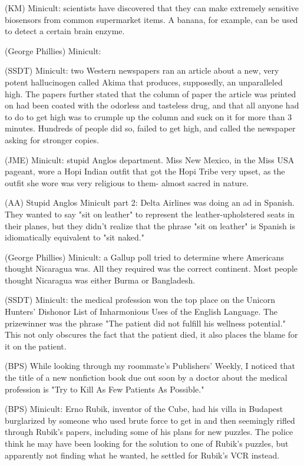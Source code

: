 \documentclass[12pt]{article}
\begin{document}
(KM) Minicult: scientists have discovered that they can make extremely sensitive biosensors from common supermarket items. A banana, for example, can be used to detect a certain brain enzyme.

(George Phillies) Minicult:

(SSDT) Minicult: two Western newspapers ran an article about a new, very potent hallucinogen called Akima that produces, supposedly, an unparalleled high. The papers further stated that the column of paper the article was printed on had been coated with the odorless and tasteless drug, and that all anyone had to do to get high was to crumple up the column and suck on it for more than 3 minutes. Hundreds of people did so, failed to get high, and called the newspaper asking for stronger copies.

(JME) Minicult: stupid Anglos department. Miss New Mexico, in the Miss USA pageant, wore a Hopi Indian outfit that got the Hopi Tribe very upset, as the outfit she wore was very religious to them- almost sacred in nature.

(AA) Stupid Anglos Minicult part 2: Delta Airlines was doing an ad in Spanish. They wanted to say "sit on leather" to represent the leather-upholstered seats in their planes, but they didn't realize that the phrase "sit on leather" is Spanish is idiomatically equivalent to "sit naked."

(George Phillies) Minicult: a Gallup poll tried to determine where Americans thought Nicaragua was. All they required was the correct continent. Most people thought Nicaragua was either Burma or Bangladesh.

(SSDT) Minicult: the medical profession won the top place on the Unicorn Hunters' Dishonor List of Inharmonious Uses of the English Language. The prizewinner was the phrase "The patient did not fulfill his wellness potential." This not only obscures the fact that the patient died, it also places the blame for it on the patient.

(BPS) While looking through my roommate's Publishers' Weekly, I noticed that the title of a new nonfiction book due out soon by a doctor about the medical profession is "Try to Kill As Few Patients As Possible."

(BPS) Minicult: Erno Rubik, inventor of the Cube, had his villa in Budapest burglarized by someone who used brute force to get in and then seemingly rifled through Rubik's papers, including some of his plans for new puzzles. The police think he may have been looking for the solution to one of Rubik's puzzles, but apparently not finding what he wanted, he settled for Rubik's VCR instead.
\end{document}

